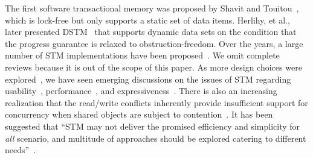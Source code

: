 \documentclass[]{sig-alternate-05-2015}
\begin{document}
The first software transactional memory was proposed by Shavit and Touitou~\cite{shavit1997software}, which is lock-free but only supports a static set of data items.
Herlihy, et al., later presented DSTM~\cite{herlihy2003software} that supports dynamic data sets on the condition that the progress guarantee is relaxed to obstruction-freedom.
Over the years, a large number of STM implementations have been proposed~\cite{saha2006mcrt,fraser2004practical,marathe2006lowering,dice2006transactional,dalessandro2010norec}.
We omit complete reviews because it is out of the scope of this paper.
As more design choices were explored~\cite{marathe2004design}, we have seen emerging discussions on the issues of STM regarding usability~\cite{Rossbach2010transactional}, performance~\cite{cascaval2008software}, and expressiveness~\cite{guerraoui2008obstruction}.
There is also an increasing realization that the read/write conflicts inherently provide insufficient support for concurrency when shared objects are subject to contention~\cite{koskinen2010coarse}.
It has been suggested that ``STM may not deliver the promised efficiency and simplicity for \emph{all} scenario, and multitude of approaches should be explored catering to different needs''~\cite{attiya2010inherent}.

\end{document}
